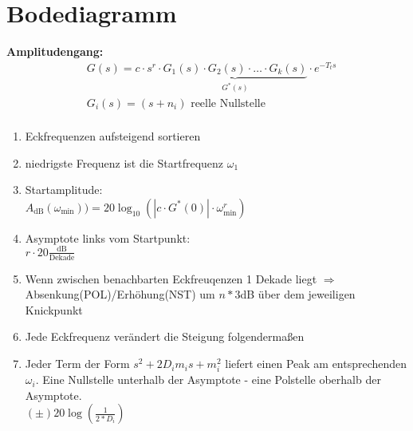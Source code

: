 \section{Bodediagramm}

\begin{tcolorbox}[colback=white!10!white,colframe=blue!50!white,title=Konstruktionsregeln]
    \textbf{Amplitudengang:}
    \begin{align*}
        &G(s) = c\cdot s^r\cdot \underbrace{G_1(s) \cdot G_2(s)\cdot \ldots \cdot G_k(s)}_{G^*(s)}\cdot e^{-T_ts}\\
        &G_i(s)  = (s+n_i)  \text{ reelle Nullstelle}\\
    \end{align*}
    \begin{enumerate}
        \item Eckfrequenzen aufsteigend sortieren
        \item niedrigste Frequenz ist die Startfrequenz $\omega_1$
        \item Startamplitude:\\ $A_{\text{dB}}(\omega_{\text{min}})) = 20 \log_{10}(|c\cdot G^{*}(0)|\cdot \omega_{\text{min}}^r)$
        \item Asymptote links vom Startpunkt:\\
        $r\cdot20 \frac{\text{dB}}{\text{Dekade}}$
        \item Wenn zwischen benachbarten Eckfreuqenzen 1 Dekade liegt $\Rightarrow$ Absenkung(POL)/Erhöhung(NST) um  $n*3$dB über dem jeweiligen Knickpunkt
        \item Jede Eckfrequenz verändert die Steigung folgendermaßen
        \item Jeder Term der Form $s^2 + 2D_im_is+m_i^2$ liefert einen Peak  am entsprechenden $\omega_i$. Eine Nullstelle unterhalb der Asymptote - eine Polstelle oberhalb der Asymptote.\\
        $(\pm)20\log(\frac{1}{2*D_i})$
    \end{enumerate}


\end{tcolorbox}
